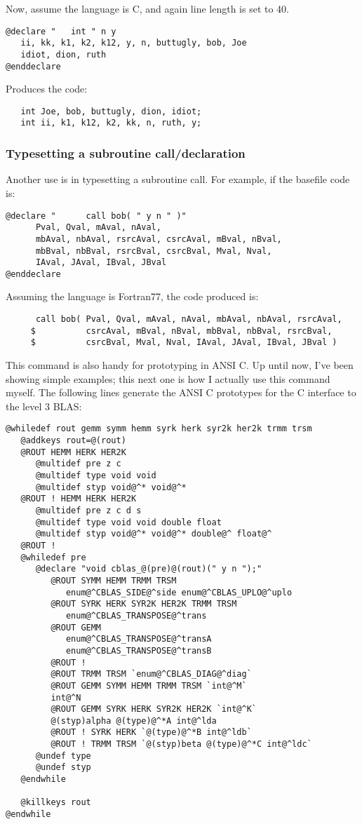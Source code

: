 \noindent
Now, assume the language is C, and again line length is set to 40.
\begin{verbatim}
@declare "   int " n y
   ii, kk, k1, k2, k12, y, n, buttugly, bob, Joe
   idiot, dion, ruth
@enddeclare
\end{verbatim}

\noindent
Produces the code:
\begin{verbatim}
   int Joe, bob, buttugly, dion, idiot;
   int ii, k1, k12, k2, kk, n, ruth, y;
\end{verbatim}

\subsubsection{Typesetting a subroutine call/declaration}
Another use is in typesetting a subroutine call.  For example, if the basefile
code is:
\begin{verbatim}
@declare "      call bob( " y n " )"
      Pval, Qval, mAval, nAval,
      mbAval, nbAval, rsrcAval, csrcAval, mBval, nBval,         
      mbBval, nbBval, rsrcBval, csrcBval, Mval, Nval,           
      IAval, JAval, IBval, JBval
@enddeclare
\end{verbatim}

\noindent
Assuming the language is Fortran77, the code produced is:
\begin{verbatim}
      call bob( Pval, Qval, mAval, nAval, mbAval, nbAval, rsrcAval, 
     $          csrcAval, mBval, nBval, mbBval, nbBval, rsrcBval, 
     $          csrcBval, Mval, Nval, IAval, JAval, IBval, JBval )
\end{verbatim}

This command is also handy for prototyping in ANSI C.  Up until now,
I've been showing simple examples;  this next one is how I actually
use this command myself.  The following lines generate the ANSI C
prototypes for the C interface to the level 3 BLAS:

\begin{verbatim}
@whiledef rout gemm symm hemm syrk herk syr2k her2k trmm trsm
   @addkeys rout=@(rout)
   @ROUT HEMM HERK HER2K
      @multidef pre z c
      @multidef type void void
      @multidef styp void@^* void@^*
   @ROUT ! HEMM HERK HER2K
      @multidef pre z c d s
      @multidef type void void double float
      @multidef styp void@^* void@^* double@^ float@^
   @ROUT !
   @whiledef pre
      @declare "void cblas_@(pre)@(rout)(" y n ");"
         @ROUT SYMM HEMM TRMM TRSM 
            enum@^CBLAS_SIDE@^side enum@^CBLAS_UPLO@^uplo
         @ROUT SYRK HERK SYR2K HER2K TRMM TRSM 
            enum@^CBLAS_TRANSPOSE@^trans
         @ROUT GEMM
            enum@^CBLAS_TRANSPOSE@^transA
            enum@^CBLAS_TRANSPOSE@^transB
         @ROUT !
         @ROUT TRMM TRSM `enum@^CBLAS_DIAG@^diag`
         @ROUT GEMM SYMM HEMM TRMM TRSM `int@^M`
         int@^N
         @ROUT GEMM SYRK HERK SYR2K HER2K `int@^K`
         @(styp)alpha @(type)@^*A int@^lda
         @ROUT ! SYRK HERK `@(type)@^*B int@^ldb`
         @ROUT ! TRMM TRSM `@(styp)beta @(type)@^*C int@^ldc`
      @undef type
      @undef styp
   @endwhile

   @killkeys rout
@endwhile
\end{verbatim}

